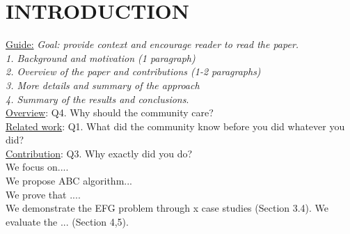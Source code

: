 
\section{INTRODUCTION}
\uline{Guide:} \textit{Goal: provide context and encourage reader to read the paper.\\
1. Background and motivation (1 paragraph)\\
2. Overview of the paper and contributions (1-2 paragraphs)\\
3. More details and summary of the approach\\
4. Summary of the results and conclusions}.\\

\noindent\uline{Overview}: Q4. Why should the community care?\\

\noindent\uline{Related work}: Q1. What did the community know before you did whatever you did?\\

\noindent\uline{Contribution}: Q3. Why exactly did you do?\\
We focus on....\\
We propose ABC algorithm...\\
We prove that ....\\
We demonstrate the EFG problem through x case studies (Section 3.4). We evaluate the ... (Section 4,5).

